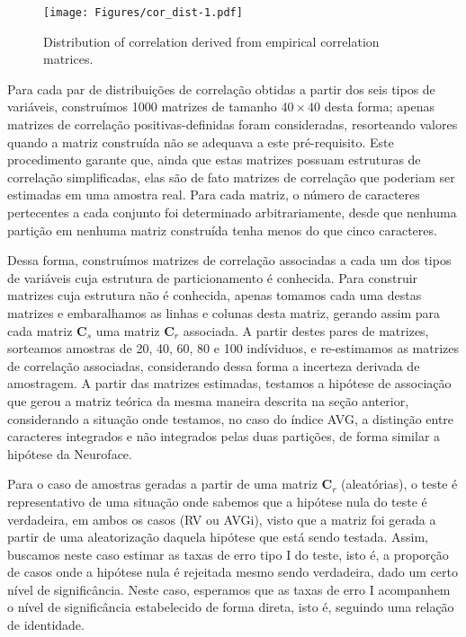 \documentclass[12pt,]{article}
\begin{document}
\begin{figure}[htbp]
\centering
\texttt{[image: Figures/cor\_dist-1.pdf]}
\caption{Distribution of correlation derived from empirical correlation
matrices. \label{fig:cor_dist}}
\end{figure}

Para cada par de distribuições de correlação obtidas a partir dos seis
tipos de variáveis, construímos 1000 matrizes de tamanho $40 \times 40$
desta forma; apenas matrizes de correlação positivas-definidas foram
consideradas, resorteando valores quando a matriz construída não se
adequava a este pré-requisito. Este procedimento garante que, ainda que
estas matrizes possuam estruturas de correlação simplificadas, elas são
de fato matrizes de correlação que poderiam ser estimadas em uma amostra
real. Para cada matriz, o número de caracteres pertecentes a cada
conjunto foi determinado arbitrariamente, desde que nenhuma partição em
nenhuma matriz construída tenha menos do que cinco caracteres.

Dessa forma, construímos matrizes de correlação associadas a cada um dos
tipos de variáveis cuja estrutura de particionamento é conhecida. Para
construir matrizes cuja estrutura não é conhecida, apenas tomamos cada
uma destas matrizes e embaralhamos as linhas e colunas desta matriz,
gerando assim para cada matriz $\mathbf{C}_s$ uma matriz $\mathbf{C}_r$
associada. A partir destes pares de matrizes, sorteamos amostras de 20,
40, 60, 80 e 100 indíviduos, e re-estimamos as matrizes de correlação
associadas, considerando dessa forma a incerteza derivada de amostragem.
A partir das matrizes estimadas, testamos a hipótese de associação que
gerou a matriz teórica da mesma maneira descrita na seção anterior,
considerando a situação onde testamos, no caso do índice AVG, a
distinção entre caracteres integrados e não integrados pelas duas
partições, de forma similar a hipótese da Neuroface.

Para o caso de amostras geradas a partir de uma matriz $\mathbf{C}_r$
(aleatórias), o teste é representativo de uma situação onde sabemos que
a hipótese nula do teste é verdadeira, em ambos os casos (RV ou AVGi),
visto que a matriz foi gerada a partir de uma aleatorização daquela
hipótese que está sendo testada. Assim, buscamos neste caso estimar as
taxas de erro tipo I do teste, isto é, a proporção de casos onde a
hipótese nula é rejeitada mesmo sendo verdadeira, dado um certo nível de
significância. Neste caso, esperamos que as taxas de erro I acompanhem o
nível de significância estabelecido de forma direta, isto é, seguindo
uma relação de identidade.
\end{document}
